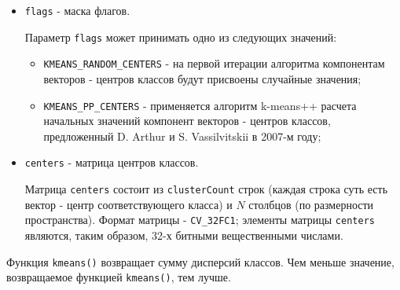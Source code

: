 \begin{itemize}
	\item \verb|flags| - маска флагов.
		
	Параметр \verb|flags| может принимать одно из следующих значений:

	\begin{itemize}

		\item \verb|KMEANS_RANDOM_CENTERS| - на первой итерации алгоритма компонентам векторов - центров классов будут присвоены случайные значения;
		\item \verb|KMEANS_PP_CENTERS| - применяется алгоритм k-means++ расчета начальных значений компонент векторов - центров классов, предложенный D. Arthur и S. Vassilvitskii в 2007-м году;

	\end{itemize}

	\item \verb|centers| - матрица центров классов.

	Матрица \verb|centers| состоит из \verb|clusterCount| строк (каждая строка суть есть вектор - центр соответствующего класса) и $N$ столбцов (по размерности пространства). Формат матрицы - \verb|CV_32FC1|; элементы матрицы \verb|centers| являются, таким образом, 32-х битными вещественными числами.

\end{itemize}

Функция \verb|kmeans()| возвращает сумму дисперсий классов. Чем меньше значение, возвращаемое функцией \verb|kmeans()|, тем лучше.

